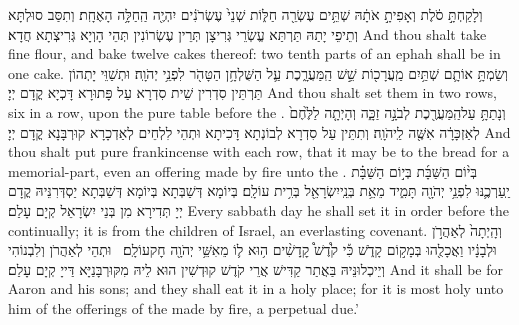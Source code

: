 {וְלָקַחְתָּ֣ סֹ֔לֶת וְאָפִיתָ֣ אֹתָ֔הּ שְׁתֵּ֥ים עֶשְׂרֵ֖ה חַלּ֑וֹת שְׁנֵי֙ עֶשְׂרֹנִ֔ים יִהְיֶ֖ה הַֽחַלָּ֥ה הָאֶחָֽת׃}
{וְתִסַּב סוּלְתָּא וְתֵיפֵי יָתַהּ תַּרְתַּא עֱשְׂרֵי גְּרִיצָן תְּרֵין עֶשְׂרוֹנִין תְּהֵי הָוְיָא גְּרִיצְתָא חֲדָא׃}
{And thou shalt take fine flour, and bake twelve cakes thereof: two tenth parts of an ephah shall be in one cake.}{}
{וְשַׂמְתָּ֥ אוֹתָ֛ם שְׁתַּ֥יִם מַֽעֲרָכ֖וֹת שֵׁ֣שׁ הַֽמַּעֲרָ֑כֶת עַ֛ל הַשֻּׁלְחָ֥ן הַטָּהֹ֖ר לִפְנֵ֥י יְהֹוָֽה׃}
{וּתְשַׁוֵּי יָתְהוֹן תַּרְתֵּין סִדְרִין שֵׁית סִדְרָא עַל פָּתוּרָא דָּכְיָא קֳדָם יְיָ׃}
{And thou shalt set them in two rows, six in a row, upon the pure table before the \lord.}{}
{וְנָתַתָּ֥ עַל\maqqaf הַֽמַּעֲרֶ֖כֶת לְבֹנָ֣ה זַכָּ֑ה וְהָיְתָ֤ה לַלֶּ֙חֶם֙ לְאַזְכָּרָ֔ה אִשֶּׁ֖ה לַֽיהֹוָֽה׃}
{וְתִתֵּין עַל סִדְרָא לְבוֹנְתָא דָּכִיתָא וּתְהֵי לִלְחֵים לְאַדְכָרָא קוּרְבָּנָא קֳדָם יְיָ׃}
{And thou shalt put pure frankincense with each row, that it may be to the bread for a memorial-part, even an offering made by fire unto the \lord.}{}
{בְּי֨וֹם הַשַּׁבָּ֜ת בְּי֣וֹם הַשַּׁבָּ֗ת יַֽעַרְכֶ֛נּוּ לִפְנֵ֥י יְהֹוָ֖ה תָּמִ֑יד מֵאֵ֥ת בְּנֵֽי\maqqaf יִשְׂרָאֵ֖ל בְּרִ֥ית עוֹלָֽם׃}
{בְּיוֹמָא דְּשַׁבְּתָא בְּיוֹמָא דְּשַׁבְּתָא יַסְדְּרִנֵּיהּ קֳדָם יְיָ תְּדִירָא מִן בְּנֵי יִשְׂרָאֵל קְיָם עָלַם׃}
{Every sabbath day he shall set it in order before the \lord\space continually; it is from the children of Israel, an everlasting covenant.}{}
{וְהָֽיְתָה֙ לְאַהֲרֹ֣ן וּלְבָנָ֔יו וַאֲכָלֻ֖הוּ בְּמָק֣וֹם קָדֹ֑שׁ כִּ֡י קֹ֩דֶשׁ֩ קׇֽדָשִׁ֨ים ה֥וּא ל֛וֹ מֵאִשֵּׁ֥י יְהֹוָ֖ה חׇק\maqqaf עוֹלָֽם׃ \setuma }
{וּתְהֵי לְאַהֲרֹן וְלִבְנוֹהִי וְיֵיכְלוּנֵּיהּ בַּאֲתַר קַדִּישׁ אֲרֵי קֹדֶשׁ קוּדְשִׁין הוּא לֵיהּ מִקּוּרְבָּנַיָּא דַּייָ קְיָם עָלַם׃}
{And it shall be for Aaron and his sons; and they shall eat it in a holy place; for it is most holy unto him of the offerings of the \lord\space made by fire, a perpetual due.’}{}
